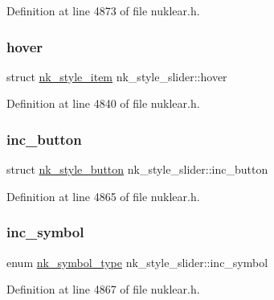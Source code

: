 Definition at line 4873 of file nuklear.\+h.

\mbox{\label{structnk__style__slider_a9f36bc9ca0a52499e74f486e7a1b4f32}} 
\subsubsection{\texorpdfstring{hover}{hover}}
{\footnotesize\ttfamily struct \mbox{\hyperlink{structnk__style__item}{nk\+\_\+style\+\_\+item}} nk\+\_\+style\+\_\+slider\+::hover}



Definition at line 4840 of file nuklear.\+h.

\mbox{\label{structnk__style__slider_a7d7bce402c16ed819a64c72b5ee1928f}} 
\subsubsection{\texorpdfstring{inc\+\_\+button}{inc\_button}}
{\footnotesize\ttfamily struct \mbox{\hyperlink{structnk__style__button}{nk\+\_\+style\+\_\+button}} nk\+\_\+style\+\_\+slider\+::inc\+\_\+button}



Definition at line 4865 of file nuklear.\+h.

\mbox{\label{structnk__style__slider_a82d0f1a7c09ae08a0462047b1c4d035d}} 
\subsubsection{\texorpdfstring{inc\+\_\+symbol}{inc\_symbol}}
{\footnotesize\ttfamily enum \mbox{\hyperlink{nuklear_8h_a29b4aaa400d0ce28aea3c8c9c372ac07}{nk\+\_\+symbol\+\_\+type}} nk\+\_\+style\+\_\+slider\+::inc\+\_\+symbol}



Definition at line 4867 of file nuklear.\+h.

